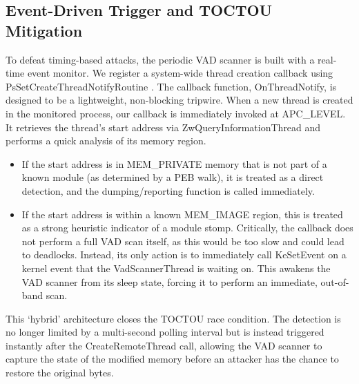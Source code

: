 \documentclass[journal]{IEEEtran}
\begin{document}
\subsection{Event-Driven Trigger and TOCTOU Mitigation}
To defeat timing-based attacks, the periodic VAD scanner is built with a real-time event monitor. We register a system-wide thread creation callback using PsSetCreateThreadNotifyRoutine \cite{microsoftPsSetCreateThreadNotify}. The callback function, OnThreadNotify, is designed to be a lightweight, non-blocking tripwire.
When a new thread is created in the monitored process, our callback is immediately invoked at APC\_LEVEL. It retrieves the thread's start address via ZwQueryInformationThread and performs a quick analysis of its memory region.
\begin{itemize}
\item If the start address is in MEM\_PRIVATE memory that is not part of a known module (as determined by a PEB walk), it is treated as a direct detection, and the dumping/reporting function is called immediately.
\item If the start address is within a known MEM\_IMAGE region, this is treated as a strong heuristic indicator of a module stomp. Critically, the callback does not perform a full VAD scan itself, as this would be too slow and could lead to deadlocks. Instead, its only action is to immediately call KeSetEvent on a kernel event that the VadScannerThread is waiting on. This awakens the VAD scanner from its sleep state, forcing it to perform an immediate, out-of-band scan.
\end{itemize}
This `hybrid' architecture closes the TOCTOU race condition. The detection is no longer limited by a multi-second polling interval but is instead triggered instantly after the CreateRemoteThread call, allowing the VAD scanner to capture the state of the modified memory before an attacker has the chance to restore the original bytes.
\end{document}
